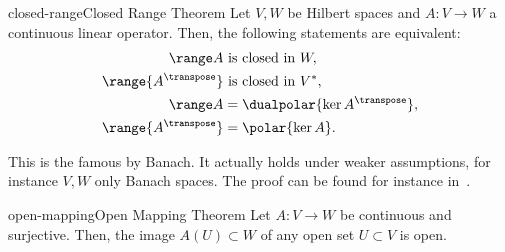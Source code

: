 




\begin{Theorem*}{closed-range}{Closed Range Theorem}
  Let $V,W$ be Hilbert spaces and $A\colon V\to W$ a continuous linear
  operator. Then, the following statements are equivalent:
  \begin{gather}
    \label{eq:infsup:9}
    \begin{split}
      \range A &\text{ is closed in } W,\\
      \range{A^\transpose} &\text{ is closed in } V^*,\\
      \range A &= \dualpolar{\ker{A^\transpose}},\\
      \range{A^\transpose} &= \polar{\ker A}.
    \end{split}
  \end{gather}
\end{Theorem*}

\begin{remark}
  This is the famous \emph{} by Banach.
  It actually holds under weaker assumptions, for instance $V,W$ only
  Banach spaces. The proof can be found for instance
  in~\cite[p.~205--209]{Yosida80}.
\end{remark}

\begin{Theorem*}{open-mapping}{Open Mapping Theorem}
  Let $A\colon V\to W$ be continuous and surjective. Then, the image
  $A(U)\subset W$ of any open set $U\subset V$ is open.
\end{Theorem*}

